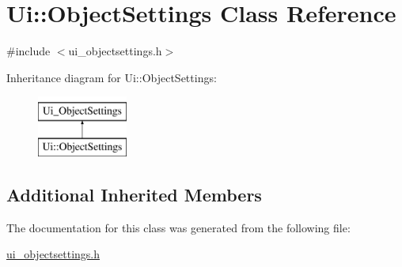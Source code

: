 \hypertarget{class_ui_1_1_object_settings}{}\section{Ui\+:\+:Object\+Settings Class Reference}
\label{class_ui_1_1_object_settings}


{\ttfamily \#include $<$ui\+\_\+objectsettings.\+h$>$}

Inheritance diagram for Ui\+:\+:Object\+Settings\+:\begin{figure}[H]
\begin{center}
\leavevmode
\includegraphics[height=2.000000cm]{class_ui_1_1_object_settings}
\end{center}
\end{figure}
\subsection*{Additional Inherited Members}


The documentation for this class was generated from the following file\+:\begin{DoxyCompactItemize}
\item 
\hyperlink{ui__objectsettings_8h}{ui\+\_\+objectsettings.\+h}\end{DoxyCompactItemize}
